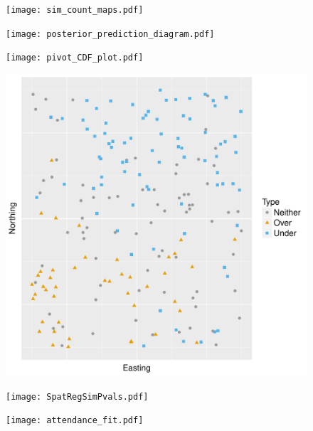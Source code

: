 \documentclass[12pt,english]{article}
\begin{document}
\begin{spacing}{1.9}
\begin{figure}
  \begin{center}
    \texttt{[image: sim\_count\_maps.pdf]}
    \caption{} \label{fig:sim_maps}
  \end{center}
\end{figure}

\begin{figure}
  \begin{center}
    \texttt{[image: posterior\_prediction\_diagram.pdf]}
    \caption{} \label{fig:post_pred}
  \end{center}
\end{figure}

\begin{figure}
  \begin{center}
    \texttt{[image: pivot\_CDF\_plot.pdf]}
    \caption{} \label{fig:pivotCDF}
  \end{center}
\end{figure}

\begin{figure}
  \begin{center}
    \includegraphics[width=170mm]{SpatReg_outlier_plot.pdf}
    \caption{} \label{fig:SpatReg_outlier}
  \end{center}
\end{figure}

\begin{figure}
  \begin{center}
    \texttt{[image: SpatRegSimPvals.pdf]}
    \caption{} \label{fig:SpatReg_pvals}
  \end{center}
\end{figure}

\begin{figure}
  \begin{center}
    \texttt{[image: attendance\_fit.pdf]}
    \caption{} \label{fig:attend}
  \end{center}
\end{figure}


\end{spacing}
\end{document}
